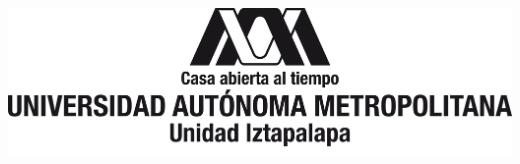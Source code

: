 % 
% 

\thispagestyle{empty}
\oddsidemargin 0.0in
\begin{minipage}[t]{\textwidth}
	\begin{center}
	 	\includegraphics[width=\textwidth]{img/variacion3Izt.png}
	\end{center}
\end{minipage}

\oddsidemargin 0.2in

